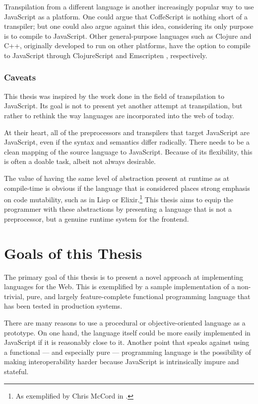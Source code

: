 \documentclass[oneside,11pt,xetex]{scrbook}
\begin{document}
Transpilation from a different language is another increasingly popular
way to use JavaScript as a platform. One could argue that CoffeScript
is nothing short of a transpiler; but one could also argue against this idea,
considering its only purpose is to compile to JavaScript. Other general-purpose
languages such as Clojure and C++, originally developed to run on other platforms,
have the option to compile to JavaScript through ClojureScript \parencite{CLJS} and
Emscripten \parencite{ZAKA}, respectively.

\subsubsection{Caveats}

This thesis was inspired by the work done in the field of transpilation to
JavaScript. Its goal is not to present yet another attempt at transpilation,
but rather to rethink the way languages are incorporated into the web of today.

At their heart, all of the preprocessors and transpilers that target JavaScript
are JavaScript, even if the syntax and semantics differ radically. There needs
to be a clean mapping of the source language to JavaScript. Because of its flexibility,
this is often a doable task, albeit not always desirable.

The value of having the same level of abstraction present at runtime as at compile-time
is obvious if the language that is considered places strong emphasis on code
mutability, such as in Lisp or Elixir.\footnote{As exemplified by Chris McCord in
\parencite{ELIX}.} This thesis aims to equip the programmer with these abstractions
by presenting a language that is not a preprocessor, but a genuine runtime system
for the frontend.

\section{Goals of this Thesis}

The primary goal of this thesis is to present a novel approach at implementing languages
for the Web. This is exemplified by a sample implementation of a non-trivial, pure, and
largely feature-complete functional programming language that has been tested
in production systems.

There are many reasons to use a procedural or objective-oriented language as
a prototype. On one hand, the language itself could be more easily implemented in
JavaScript if it is reasonably close to it. Another point that speaks
against using a functional --- and especially pure --- programming language is the
possibility of making interoperability harder because JavaScript is intrinsically
impure and stateful.
\end{document}
